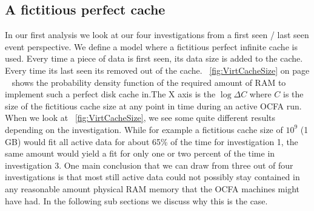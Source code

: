 \subsection{A fictitious perfect cache}
In our first analysis we look at our four investigations from a first seen / last seen event perspective. We define a model where a fictitious perfect infinite cache is used. Every time a piece of data is first seen, its data size is added to the cache. Every time its last seen its removed out of the cache. ~\ref{fig:VirtCacheSize} on page ~\pageref{fig:VirtCacheSize} shows the probability density function of the required amount of RAM to implement such a perfect disk cache in.The X axis is the $\log{\Delta C}$ where $C$ is the size of the fictitious cache size at any point in time during an active OCFA run. When we look at ~\ref{fig:VirtCacheSize}, we see some quite different results depending on the investigation. While for example a fictitious cache size of $10^9$ (1 GB) would fit all active data for about 65\% of the time for investigation 1, the same amount would yield a fit for only one or two percent of the time in investigation 3. One main conclusion that we can draw from three out of four investigations is that most still active data could not possibly stay contained in any reasonable amount physical RAM memory that the OCFA machines might have had. In the following sub sections we discuss why this is the case.
